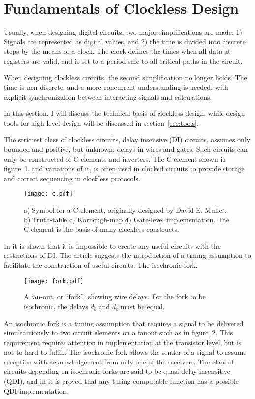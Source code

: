 \section{Fundamentals of Clockless Design}

Usually, when designing digital circuits, two major simplifications
are made: 1) Signals are represented as digital values, and 2) the
time is divided into discrete steps by the means of a clock. The clock
defines the times when all data at registers are valid, and is set to
a period safe to all critical paths in the circuit.

When designing clockless circuits, the second simplification no longer
holds. The time is non-discrete, and a more concurrent understanding
is needed, with explicit synchronization between interacting signals
and calculations.

In this section, I will discuss the technical basis of clockless
design, while design tools for high level design will be discussed in
section~\ref{sec:tools}.

The strictest class of clockless circuits, delay insensive
(DI) circuits, assumes only
bounded and positive, but unknown, delays in wires and gates. Such
circuits can only be constructed of C-elements and inverters. The
C-element shown in figure~\ref{fig:c}, and variations of it, is often
used in clocked circuits to provide storage and correct sequencing in
clockless protocols.

\begin{figure}[htbp]
  \centering
  \texttt{[image: c.pdf]}
  \caption{a) Symbol for a C-element, originally designed by David
    E. Muller. b) Truth-table c) Karnough-map d) Gate-level
    implementation. The C-element is the basis of many clockless
    constructs.}
  \label{fig:c}
\end{figure}

In \cite{dilimit} it is shown that it is impossible to create any
useful circuits with the restrictions of DI. The article suggests the
introduction of a timing assumption to facilitate the construction of
useful circuits: The isochronic fork.

\begin{figure}[htbp]
  \centering
  \texttt{[image: fork.pdf]}
  \caption{A fan-out, or ``fork'', showing wire delays. For the
    fork to be isochronic, the delays $d_b$ and $d_c$ must be equal.}
  \label{fig:fork}
\end{figure}

An isochronic fork is a timing assumption that requires a signal to be
delivered simultainiously to two circuit elements on a fanout such as
in figure~\ref{fig:fork}. This requirement requires attention in
implementation at the transistor level, but is not to hard to
fulfill. The isochronic fork allows the sender of a signal to assume
reception with acknowledgement from only one of the receivers. The
class of circuits depending on isochronic forks are said to be quasi
delay insensitive (QDI),
and in \cite{turing} it is proved that any turing computable function
has a possible QDI implementation.

